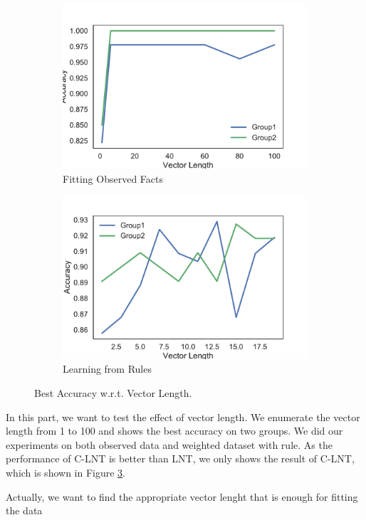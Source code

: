 \begin{figure}[!]
    \centering
    \begin{subfigure}[]{0.5\textwidth}
        \includegraphics[width=\textwidth]{img/curve3.pdf}
        \caption{Fitting Observed Facts}
        \label{fig:sensitive-best-accuracy-1}
    \end{subfigure}

    \begin{subfigure}[]{0.5\textwidth}
        \includegraphics[width=\textwidth]{img/curve4.pdf}
        \caption{Learning from Rules }
        \label{fig:sensitive-best-accuracy-2}
    \end{subfigure}
    \caption{Best Accuracy w.r.t. Vector Length.}
    \label{fig:sensitive}
\end{figure}

In this part, we want to test the effect of vector length. We enumerate the vector length from 1 to 100 and shows the best accuracy on two groups. We did our experiments on both observed data and weighted dataset with rule. As the performance of C-LNT is better than LNT, we only shows the result of C-LNT, which is shown in Figure \ref{fig:sensitive}.


Actually, we want to find the appropriate vector lenght that is enough for fitting the data
